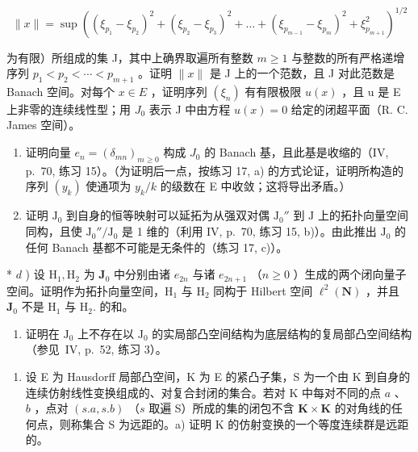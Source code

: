 \[
\| x \| = \sup \left(\left(\xi_ {p _ {1}} - \xi_ {p _ {2}}\right) ^ {2} + \left(\xi_ {p _ {2}} - \xi_ {p _ {3}}\right) ^ {2} + \dots + \left(\xi_ {p _ {m - 1}} - \xi_ {p _ {m}}\right) ^ {2} + \xi_ {p _ {m + 1}} ^ {2}\right) ^ {1 / 2}
\]

为有限）所组成的集 J，其中上确界取遍所有整数 \(m \geqslant 1\) 与整数的所有严格递增序列 \(p_{1} < p_{2} < \cdots < p_{m+1}\) 。证明 \(\|x\|\) 是 J 上的一个范数，且 J 对此范数是 Banach 空间。对每个 \(x \in E\) ，证明序列 \((\xi_{n})\) 有有限极限 \(u(x)\) ，且 u 是 E 上非零的连续线性型；用 \(J_{0}\) 表示 J 中由方程 \(u(x) = 0\) 给定的闭超平面（R. C. James 空间）。

\begin{enumerate}
\def\labelenumi{\alph{enumi})}
\setcounter{enumi}{1}
\item
  证明向量 \(e_n = (\delta_{mn})_{m \geq 0}\) 构成 \(J_0\) 的 Banach 基，且此基是收缩的（IV, p.~70, 练习 15）。（为证明后一点，按练习 17, a) 的方式论证，证明所构造的序列 \((y_k)\) 使通项为 \(y_k / k\) 的级数在 E 中收敛；这将导出矛盾。）
\item
  证明 \(\mathrm{J}_0\) 到自身的恒等映射可以延拓为从强双对偶 \(\mathrm{J}_0''\) 到 \(\mathrm{J}\) 上的拓扑向量空间同构，且使 \(\mathrm{J}_0'' / \mathrm{J}_0\) 是 1 维的（利用 IV, p.~70, 练习 15, b)）。由此推出 \(\mathrm{J}_0\) 的任何 Banach 基都不可能是无条件的（练习 17, c)）。
\end{enumerate}

* \(d\) ) 设 \(\mathrm{H}_1,\mathrm{H}_2\) 为 \(\mathbf{J}_0\) 中分别由诸 \(e_{2n}\) 与诸 \(e_{2n + 1}\) （\(n\geqslant 0\) ）生成的两个闭向量子空间。证明作为拓扑向量空间，\(\mathrm{H}_{1}\) 与 \(\mathrm{H}_{2}\) 同构于 Hilbert 空间 \(\ell^2 (\mathbf{N})\) ，并且 \(\mathbf{J}_0\) 不是 \(\mathrm{H}_1\) 与 \(\mathrm{H}_2.\) 的和。

\begin{enumerate}
\def\labelenumi{\alph{enumi})}
\setcounter{enumi}{4}
\tightlist
\item
  证明在 \(\mathrm{J}_0\) 上不存在以 \(\mathrm{J}_0\) 的实局部凸空间结构为底层结构的复局部凸空间结构（参见~IV, p.~52, 练习 3）。
\end{enumerate}

\exerciseappendix

\begin{enumerate}
\def\labelenumi{\arabic{enumi})}
\tightlist
\item
  设 E 为 Hausdorff 局部凸空间，K 为 E 的紧凸子集，S 为一个由 K 到自身的连续仿射线性变换组成的、对复合封闭的集合。若对 K 中每对不同的点 \(a\) 、 \(b\) ，点对 \((s.a,s.b)\) （\(s\) 取遍 S）所成的集的闭包不含 \(\mathbf{K} \times \mathbf{K}\) 的对角线的任何点，则称集合 S 为远距的。a) 证明 K 的仿射变换的一个等度连续群是远距的。
\end{enumerate}

